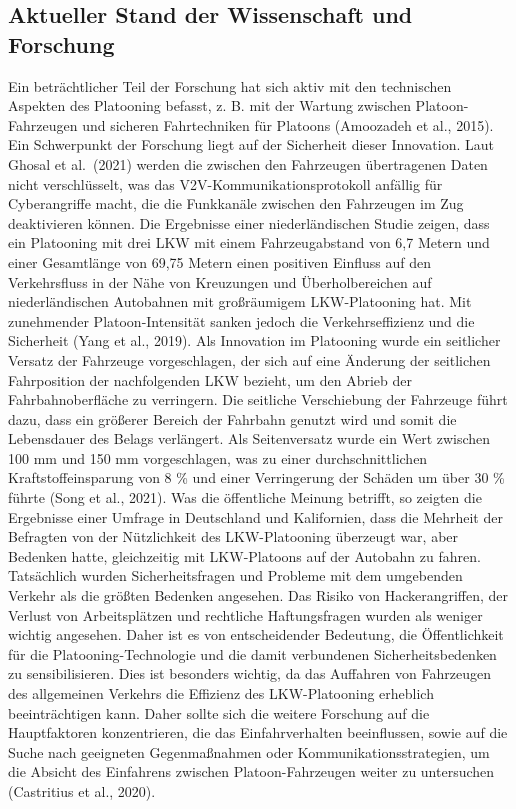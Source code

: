 \documentclass[
]{book}
\begin{document}
\hypertarget{aktueller-stand-der-wissenschaft-und-forschung-10}{%
\subsection*{Aktueller Stand der Wissenschaft und Forschung}\label{aktueller-stand-der-wissenschaft-und-forschung-10}}

Ein beträchtlicher Teil der Forschung hat sich aktiv mit den technischen Aspekten des Platooning befasst, z. B. mit der Wartung zwischen Platoon-Fahrzeugen und sicheren Fahrtechniken für Platoons (Amoozadeh et al., 2015). Ein Schwerpunkt der Forschung liegt auf der Sicherheit dieser Innovation. Laut Ghosal et al.~(2021) werden die zwischen den Fahrzeugen übertragenen Daten nicht verschlüsselt, was das V2V-Kommunikationsprotokoll anfällig für Cyberangriffe macht, die die Funkkanäle zwischen den Fahrzeugen im Zug deaktivieren können.
Die Ergebnisse einer niederländischen Studie zeigen, dass ein Platooning mit drei LKW mit einem Fahrzeugabstand von 6,7 Metern und einer Gesamtlänge von 69,75 Metern einen positiven Einfluss auf den Verkehrsfluss in der Nähe von Kreuzungen und Überholbereichen auf niederländischen Autobahnen mit großräumigem LKW-Platooning hat. Mit zunehmender Platoon-Intensität sanken jedoch die Verkehrseffizienz und die Sicherheit (Yang et al., 2019).
Als Innovation im Platooning wurde ein seitlicher Versatz der Fahrzeuge vorgeschlagen, der sich auf eine Änderung der seitlichen Fahrposition der nachfolgenden LKW bezieht, um den Abrieb der Fahrbahnoberfläche zu verringern. Die seitliche Verschiebung der Fahrzeuge führt dazu, dass ein größerer Bereich der Fahrbahn genutzt wird und somit die Lebensdauer des Belags verlängert. Als Seitenversatz wurde ein Wert zwischen 100 mm und 150 mm vorgeschlagen, was zu einer durchschnittlichen Kraftstoffeinsparung von 8 \% und einer Verringerung der Schäden um über 30 \% führte (Song et al., 2021).
Was die öffentliche Meinung betrifft, so zeigten die Ergebnisse einer Umfrage in Deutschland und Kalifornien, dass die Mehrheit der Befragten von der Nützlichkeit des LKW-Platooning überzeugt war, aber Bedenken hatte, gleichzeitig mit LKW-Platoons auf der Autobahn zu fahren. Tatsächlich wurden Sicherheitsfragen und Probleme mit dem umgebenden Verkehr als die größten Bedenken angesehen. Das Risiko von Hackerangriffen, der Verlust von Arbeitsplätzen und rechtliche Haftungsfragen wurden als weniger wichtig angesehen. Daher ist es von entscheidender Bedeutung, die Öffentlichkeit für die Platooning-Technologie und die damit verbundenen Sicherheitsbedenken zu sensibilisieren. Dies ist besonders wichtig, da das Auffahren von Fahrzeugen des allgemeinen Verkehrs die Effizienz des LKW-Platooning erheblich beeinträchtigen kann. Daher sollte sich die weitere Forschung auf die Hauptfaktoren konzentrieren, die das Einfahrverhalten beeinflussen, sowie auf die Suche nach geeigneten Gegenmaßnahmen oder Kommunikationsstrategien, um die Absicht des Einfahrens zwischen Platoon-Fahrzeugen weiter zu untersuchen (Castritius et al., 2020).
\end{document}
